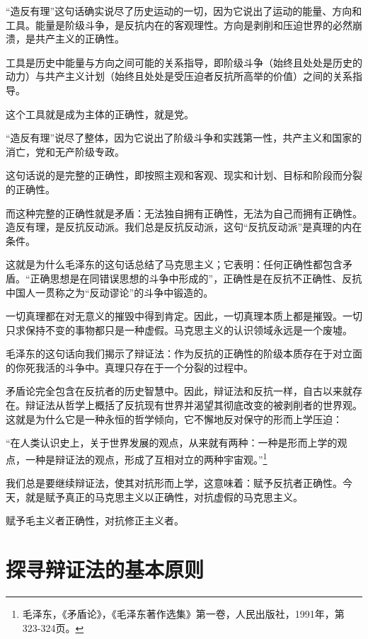 \documentclass[fontset=fandol, a4paper, 12pt, twoside]{ctexart}
\renewenvironment{quote}
  {\list{}{\rightmargin=0cm \leftmargin=2em}%
   \item\relax\small\kaishu\color{black}}
  {\endlist}
\begin{document}
“造反有理”这句话确实说尽了历史运动的一切，因为它说出了运动的能量、方向和工具。能量是阶级斗争，是反抗内在的客观理性。方向是剥削和压迫世界的必然崩溃，是共产主义的正确性。

工具是历史中能量与方向之间可能的关系指导，即阶级斗争（始终且处处是历史的动力）与共产主义计划（始终且处处是受压迫者反抗所高举的价值）之间的关系指导。

这个工具就是成为主体的正确性，就是党。

“造反有理”说尽了整体，因为它说出了阶级斗争和实践第一性，共产主义和国家的消亡，党和无产阶级专政。

这句话说的是完整的正确性，即按照主观和客观、现实和计划、目标和阶段而分裂的正确性。

而这种完整的正确性就是矛盾：无法独自拥有正确性，无法为自己而拥有正确性。造反有理，是反抗反动派。我们总是反抗反动派，这句“反抗反动派”是真理的内在条件。

这就是为什么毛泽东的这句话总结了马克思主义；它表明：任何正确性都包含矛盾。“正确思想是在同错误思想的斗争中形成的”，正确性是在反抗不正确性、反抗中国人一贯称之为“反动谬论”的斗争中锻造的。

一切真理都在对无意义的摧毁中得到肯定。因此，一切真理本质上都是摧毁。一切只求保持不变的事物都只是一种虚假。马克思主义的认识领域永远是一个废墟。

毛泽东的这句话向我们揭示了辩证法：作为反抗的正确性的阶级本质存在于对立面的你死我活的斗争中。真理只存在于一个分裂的过程中。

矛盾论完全包含在反抗者的历史智慧中。因此，辩证法和反抗一样，自古以来就存在。辩证法从哲学上概括了反抗现有世界并渴望其彻底改变的被剥削者的世界观。这就是为什么它是一种永恒的哲学倾向，它不懈地反对保守的形而上学压迫：

\begin{quote}
“在人类认识史上，关于世界发展的观点，从来就有两种：一种是形而上学的观点，一种是辩证法的观点，形成了互相对立的两种宇宙观。”\footnote{毛泽东，《矛盾论》，《毛泽东著作选集》第一卷，人民出版社，1991年，第323-324页。}
\end{quote}

我们总是要继续辩证法，使其对抗形而上学，这意味着：赋予反抗者正确性。今天，就是赋予真正的马克思主义以正确性，对抗虚假的马克思主义。

赋予毛主义者正确性，对抗修正主义者。

\section{探寻辩证法的基本原则}
\end{document}
